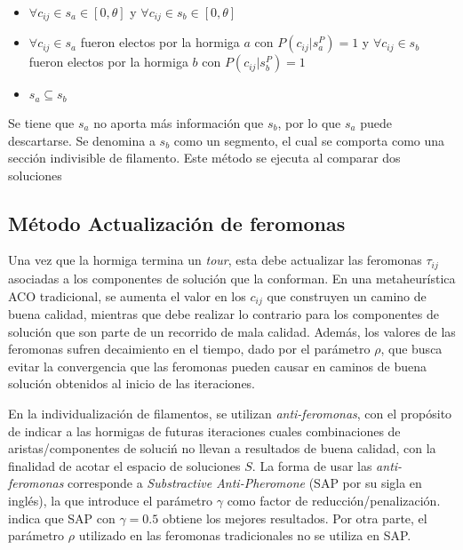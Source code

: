 \begin{itemize}
    \item $\forall c_{ij} \in s_a \in [0, \theta]$ y $\forall c_{ij} \in s_b \in [0, \theta]$
    \item $\forall c_{ij} \in s_a$ fueron electos por la hormiga $a$ con $P(c_{ij} | s_{a}^{P}) = 1$ y $\forall c_{ij} \in s_b$ fueron electos por la hormiga $b$ con $P(c_{ij} | s_{b}^{P}) = 1$
    \item $s_a \subseteq s_b$
\end{itemize}

Se tiene que $s_a$ no aporta m\'as informaci\'on que $s_b$, por lo que $s_a$ puede descartarse. Se denomina a $s_b$ como un segmento, el cual se comporta como una secci\'on indivisible de filamento. Este m\'etodo se ejecuta al comparar dos soluciones 

    
\subsection{M\'etodo Actualizaci\'on de feromonas}
\label{subsec:pheroUpdate}
Una vez que la hormiga termina un {\it tour}, esta debe actualizar las feromonas $\tau_{ij}$ asociadas a los componentes de soluci\'on que la conforman. En una metaheur\'istica ACO tradicional, se aumenta el valor en los $c_{ij}$ que construyen un camino de buena calidad, mientras que debe realizar lo contrario para los componentes de soluci\'on que son parte de un recorrido de mala calidad. Adem\'as, los valores de las feromonas sufren decaimiento en el tiempo, dado por el par\'ametro $\rho$, que busca evitar la convergencia que las feromonas pueden causar en caminos de buena soluci\'on obtenidos al inicio de las iteraciones.


En la individualizaci\'on de filamentos, se utilizan {\it anti-feromonas}, con el prop\'osito de indicar a las hormigas de futuras iteraciones cuales combinaciones de aristas/componentes de soluci\'n no llevan a resultados de buena calidad, con la finalidad de acotar el espacio de soluciones $S$. La forma de usar las {\it anti-feromonas} corresponde a {\it Substractive Anti-Pheromone} (SAP por su sigla en ingl\'es), la que introduce el par\'ametro $\gamma$ como factor de reducci\'on/penalizaci\'on. \cite{montgomery2002anti} indica que SAP con $\gamma = 0.5$ obtiene los mejores resultados. Por otra parte, el par\'ametro $\rho$ utilizado en las feromonas tradicionales no se utiliza en SAP.


